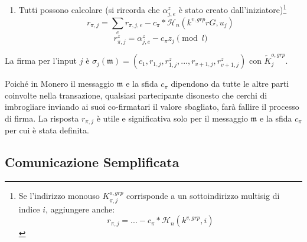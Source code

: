 \begin{enumerate}
\begin{enumerate}
    \end{enumerate}
    \item Tutti possono calcolare (si rircorda che $\alpha^z_{j,e}$ è stato creato dall'iniziatore)\footnote{Se l'indirizzo monouso $K^{o,grp}_{\pi,j}$ corrisponde a un sottoindirizzo multisig di indice $i$, aggiungere anche:
    \[r_{\pi,j} = ... - c_{\pi}*\mathcal{H}_n(k^{v,grp},i)\]}\vspace{.175cm}
    \[r_{\pi,j} = \sum_e r_{\pi,j,e} - c_{\pi}*\mathcal{H}_n(k^{v,grp} r G, u_j)\]
    \[r^{z}_{\pi,j} = \alpha^z_{j,e} - c_{\pi} z_j \pmod l\]
\end{enumerate}

La firma per l'input $j$ è $\sigma_j(\mathfrak{m}) = (c_1,r_{1,j},r^{z}_{1,j},...,r_{v+1,j},r^{z}_{v+1,j})$ con $\tilde{K}^{o,grp}_j$.

Poiché in Monero il messaggio $\mathfrak{m}$ e la sfida $c_{\pi}$ dipendono da tutte le altre parti coinvolte nella transazione, qualsiasi partecipante disonesto che cerchi di imbrogliare inviando ai suoi co-firmatari il valore sbagliato, farà fallire il processo di firma. La risposta $r_{\pi,j}$ è utile e significativa solo per il messaggio $\mathfrak{m}$ e la sfida $c_{\pi}$ per cui è stata definita.


\subsection{Comunicazione Semplificata}
\label{sec:simplified-communication}


